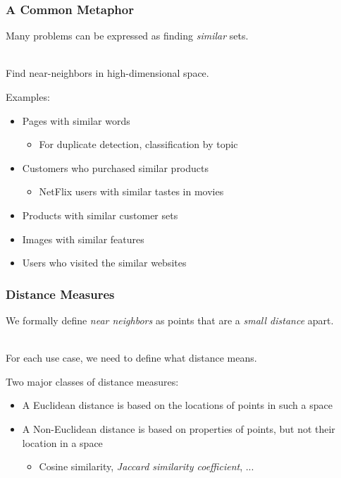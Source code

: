 \documentclass[svgnames]{beamer}
\begin{document}
\begin{frame} \frametitle{A Common Metaphor}

Many problems can be expressed as finding \emph{similar} sets.

~\\
Find near-neighbors in high-dimensional space.

\begin{block}{Examples:}
  \begin{itemize}
  \item Pages with similar words
    \begin{itemize}
    \item For duplicate detection, classification by topic
    \end{itemize}
  \item Customers who purchased similar products
    \begin{itemize}
    \item NetFlix users with similar tastes in movies
    \end{itemize}
  \item Products with similar customer sets
  \item Images with similar features
  \item Users who visited the similar websites
  \end{itemize}
\end{block}
\end{frame}

  
\begin{frame} \frametitle{Distance Measures}

We formally define \emph{near neighbors} as points that are a \emph{small distance} apart.

~\\
For each use case, we need to define what distance means.

\begin{block}{Two major classes of distance measures:}
  \begin{itemize}
  \item A Euclidean distance is based on the locations of points in such a space
  \item A Non-Euclidean distance is based on properties of points, but not their location in a space
    \begin{itemize}
    \item Cosine similarity, \emph{Jaccard similarity coefficient}, ...
    \end{itemize}
  \end{itemize}
\end{block}  
\end{frame}
\end{document}
